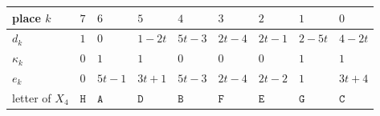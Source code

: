 \documentclass[11pt,letterpaper]{article}
\theoremstyle{paperstyle}
\theoremstyle{paperstyledef}
\theoremstyle{paperstylerem}
\begin{document}
{\def\LTcaptype{none} %
\begin{longtable}[]{@{}
  >{\raggedright\arraybackslash}p{}
  >{\raggedright\arraybackslash}p{}
  >{\raggedright\arraybackslash}p{}
  >{\raggedright\arraybackslash}p{}
  >{\raggedright\arraybackslash}p{}
  >{\raggedright\arraybackslash}p{}
  >{\raggedright\arraybackslash}p{}
  >{\raggedright\arraybackslash}p{}
  >{\raggedright\arraybackslash}p{}@{}}
\toprule\noalign{}
\begin{minipage}[b]{\linewidth}\raggedright
place \(k\)
\end{minipage} & \begin{minipage}[b]{\linewidth}\raggedright
\(7\)
\end{minipage} & \begin{minipage}[b]{\linewidth}\raggedright
\(6\)
\end{minipage} & \begin{minipage}[b]{\linewidth}\raggedright
\(5\)
\end{minipage} & \begin{minipage}[b]{\linewidth}\raggedright
\(4\)
\end{minipage} & \begin{minipage}[b]{\linewidth}\raggedright
\(3\)
\end{minipage} & \begin{minipage}[b]{\linewidth}\raggedright
\(2\)
\end{minipage} & \begin{minipage}[b]{\linewidth}\raggedright
\(1\)
\end{minipage} & \begin{minipage}[b]{\linewidth}\raggedright
\(0\)
\end{minipage} \\
\midrule\noalign{}
\endhead
\bottomrule\noalign{}
\endlastfoot
\(d_k\) & \(1\) & \(0\) & \(1-2t\) & \(5t-3\) & \(2t-4\) & \(2t-1\) & \(2-5t\) & \(4-2t\) \\
\(\kappa_k\) & \(0\) & \(1\) & \(1\) & \(0\) & \(0\) & \(0\) & \(1\) & \(1\) \\
\(e_k\) & \(0\) & \(5t-1\) & \(3t+1\) & \(5t-3\) & \(2t-4\) & \(2t-2\) & \(1\) & \(3t+4\) \\
letter of \(X_4\) & \(\mathtt{H}\) & \(\mathtt{A}\) & \(\mathtt{D}\) & \(\mathtt{B}\) & \(\mathtt{F}\) & \(\mathtt{E}\) & \(\mathtt{G}\) & \(\mathtt{C}\) \\
\end{longtable}
}
\end{document}
